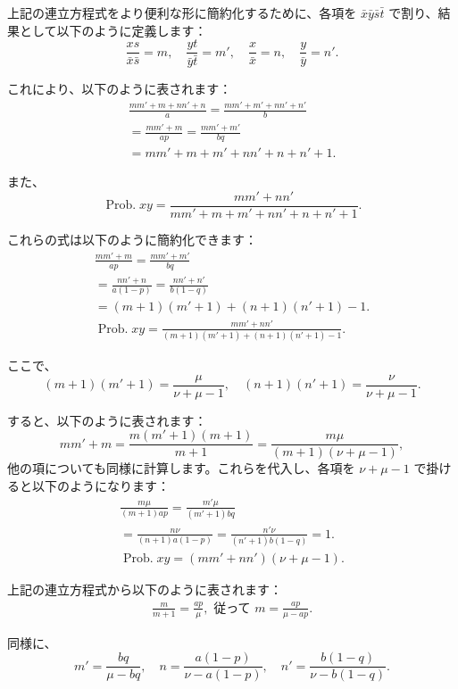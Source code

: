 \documentclass[a4paper,11pt,openany]{ltjsbook}
\begin{document}
上記の連立方程式をより便利な形に簡約化するために、各項を \( \bar{x} \bar{y} \bar{s} \bar{t} \) で割り、結果として以下のように定義します：
\[
\frac{xs}{\bar{x} \bar{s}} = m, \quad \frac{yt}{\bar{y} \bar{t}} = m', \quad \frac{x}{\bar{x}} = n, \quad \frac{y}{\bar{y}} = n'.
\]

これにより、以下のように表されます：
\begin{gather*}
\frac{mm' + m + nn' + n}{a} = \frac{mm' + m' + nn' + n'}{b} \\
= \frac{mm' + m}{ap} = \frac{mm' + m'}{bq} \\
= mm' + m + m' + nn' + n + n' + 1.
\end{gather*}

また、
\[
\operatorname{Prob. } xy = \frac{mm' + nn'}{mm' + m + m' + nn' + n + n' + 1}.
\]

これらの式は以下のように簡約化できます：
\begin{gather*}
\frac{mm' + m}{ap} = \frac{mm' + m'}{bq} \\
= \frac{nn' + n}{a(1 - p)} = \frac{nn' + n'}{b(1 - q)} \\
= (m + 1)(m' + 1) + (n + 1)(n' + 1) - 1. \\
\operatorname{Prob. } xy = \frac{mm' + nn'}{(m + 1)(m' + 1) + (n + 1)(n' + 1) - 1}.
\end{gather*}

ここで、
\[
(m + 1)(m' + 1) = \frac{\mu}{\nu + \mu - 1}, \quad (n + 1)(n' + 1) = \frac{\nu}{\nu + \mu - 1}.
\]

すると、以下のように表されます：
\[
mm' + m = \frac{m(m' + 1)(m + 1)}{m + 1} = \frac{m \mu}{(m + 1)(\nu + \mu - 1)},
\]
他の項についても同様に計算します。これらを代入し、各項を \( \nu + \mu - 1 \) で掛けると以下のようになります：
\begin{gather*}
\frac{m \mu}{(m + 1)ap} = \frac{m' \mu}{(m' + 1)bq} \\
= \frac{n \nu}{(n + 1)a(1 - p)} = \frac{n' \nu}{(n' + 1)b(1 - q)} = 1.
\\
\operatorname{Prob. } xy = (mm' + nn')(\nu + \mu - 1).
\end{gather*}

上記の連立方程式から以下のように表されます：
\begin{gather*}
\frac{m}{m + 1} = \frac{ap}{\mu}, \text{ 従って } m = \frac{ap}{\mu - ap}.
\end{gather*}

同様に、
\[
m' = \frac{bq}{\mu - bq}, \quad n = \frac{a(1 - p)}{\nu - a(1 - p)}, \quad n' = \frac{b(1 - q)}{\nu - b(1 - q)}.
\]
\end{document}
